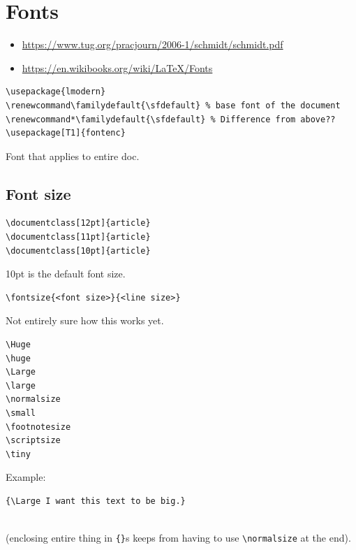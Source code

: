 \documentclass{article}
\begin{document}
\newpage
\section{Fonts}
\begin{itemize}
    \item \url{https://www.tug.org/pracjourn/2006-1/schmidt/schmidt.pdf}
    \item \url{https://en.wikibooks.org/wiki/LaTeX/Fonts}
\end{itemize}

\begin{minipage}[t]{0.5\textwidth}
    \begin{lstlisting}
\usepackage{lmodern}
\renewcommand\familydefault{\sfdefault} % base font of the document
\renewcommand*\familydefault{\sfdefault} % Difference from above??
\usepackage[T1]{fontenc}
    \end{lstlisting}
\end{minipage}
\begin{minipage}[t]{0.5\textwidth}
    Font that applies to entire doc.
\end{minipage}

\subsection{Font size}
\begin{minipage}[t]{0.5\textwidth}
\begin{lstlisting}
\documentclass[12pt]{article}
\documentclass[11pt]{article}
\documentclass[10pt]{article}
\end{lstlisting}
\end{minipage}
\begin{minipage}[t]{0.5\textwidth}
10pt is the default font size.
\end{minipage}

\begin{minipage}[t]{0.5\textwidth}
\begin{verbatim}
\fontsize{<font size>}{<line size>}
\end{verbatim}
\end{minipage}
\begin{minipage}[t]{0.5\textwidth}
    Not entirely sure how this works yet.
\end{minipage}

\begin{minipage}[t]{0.5\textwidth}
\begin{verbatim}
\Huge
\huge
\Large
\large
\normalsize
\small
\footnotesize
\scriptsize
\tiny
\end{verbatim}
\end{minipage}
\begin{minipage}[t]{0.5\textwidth}
    Example:
\begin{verbatim}
{\Large I want this text to be big.}
\end{verbatim}
    \vspace{-2ex}{\Large I want this text to be big.}\\
(enclosing entire thing in \verb|{}|s keeps from having to use
\verb|\normalsize| at the end).
\end{minipage}
\end{document}
